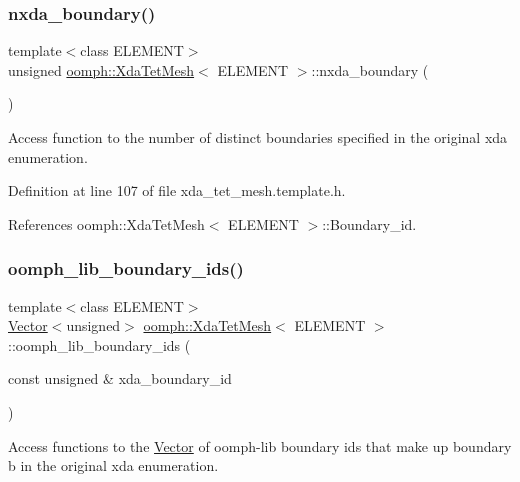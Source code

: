 \subsubsection{\texorpdfstring{nxda\+\_\+boundary()}{nxda\_boundary()}}
{\footnotesize\ttfamily template$<$class E\+L\+E\+M\+E\+NT$>$ \\
unsigned \hyperlink{classoomph_1_1XdaTetMesh}{oomph\+::\+Xda\+Tet\+Mesh}$<$ E\+L\+E\+M\+E\+NT $>$\+::nxda\+\_\+boundary (\begin{DoxyParamCaption}{ }\end{DoxyParamCaption})\hspace{0.3cm}{\ttfamily [inline]}}



Access function to the number of distinct boundaries specified in the original xda enumeration. 



Definition at line 107 of file xda\+\_\+tet\+\_\+mesh.\+template.\+h.



References oomph\+::\+Xda\+Tet\+Mesh$<$ E\+L\+E\+M\+E\+N\+T $>$\+::\+Boundary\+\_\+id.

\mbox{\label{classoomph_1_1XdaTetMesh_ab690c0224586bfc7b46ff173da855ddd}} 
\subsubsection{\texorpdfstring{oomph\+\_\+lib\+\_\+boundary\+\_\+ids()}{oomph\_lib\_boundary\_ids()}}
{\footnotesize\ttfamily template$<$class E\+L\+E\+M\+E\+NT$>$ \\
\hyperlink{classoomph_1_1Vector}{Vector}$<$unsigned$>$ \hyperlink{classoomph_1_1XdaTetMesh}{oomph\+::\+Xda\+Tet\+Mesh}$<$ E\+L\+E\+M\+E\+NT $>$\+::oomph\+\_\+lib\+\_\+boundary\+\_\+ids (\begin{DoxyParamCaption}\item[{const unsigned \&}]{xda\+\_\+boundary\+\_\+id }\end{DoxyParamCaption})\hspace{0.3cm}{\ttfamily [inline]}}



Access functions to the \hyperlink{classoomph_1_1Vector}{Vector} of oomph-\/lib boundary ids that make up boundary b in the original xda enumeration. 




